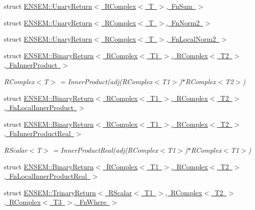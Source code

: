 \begin{DoxyCompactItemize}
\item 
struct \mbox{\hyperlink{structENSEM_1_1UnaryReturn_3_01RComplex_3_01T_01_4_00_01FnSum_01_4}{E\+N\+S\+E\+M\+::\+Unary\+Return$<$ R\+Complex$<$ T $>$, Fn\+Sum $>$}}
\item 
struct \mbox{\hyperlink{structENSEM_1_1UnaryReturn_3_01RComplex_3_01T_01_4_00_01FnNorm2_01_4}{E\+N\+S\+E\+M\+::\+Unary\+Return$<$ R\+Complex$<$ T $>$, Fn\+Norm2 $>$}}
\item 
struct \mbox{\hyperlink{structENSEM_1_1UnaryReturn_3_01RComplex_3_01T_01_4_00_01FnLocalNorm2_01_4}{E\+N\+S\+E\+M\+::\+Unary\+Return$<$ R\+Complex$<$ T $>$, Fn\+Local\+Norm2 $>$}}
\item 
struct \mbox{\hyperlink{structENSEM_1_1BinaryReturn_3_01RComplex_3_01T1_01_4_00_01RComplex_3_01T2_01_4_00_01FnInnerProduct_01_4}{E\+N\+S\+E\+M\+::\+Binary\+Return$<$ R\+Complex$<$ T1 $>$, R\+Complex$<$ T2 $>$, Fn\+Inner\+Product $>$}}
\begin{DoxyCompactList}\small\item\em R\+Complex$<$\+T$>$ = Inner\+Product(adj(\+R\+Complex$<$\+T1$>$)$\ast$\+R\+Complex$<$\+T2$>$) \end{DoxyCompactList}\item 
struct \mbox{\hyperlink{structENSEM_1_1BinaryReturn_3_01RComplex_3_01T1_01_4_00_01RComplex_3_01T2_01_4_00_01FnLocalInnerProduct_01_4}{E\+N\+S\+E\+M\+::\+Binary\+Return$<$ R\+Complex$<$ T1 $>$, R\+Complex$<$ T2 $>$, Fn\+Local\+Inner\+Product $>$}}
\item 
struct \mbox{\hyperlink{structENSEM_1_1BinaryReturn_3_01RComplex_3_01T1_01_4_00_01RComplex_3_01T2_01_4_00_01FnInnerProductReal_01_4}{E\+N\+S\+E\+M\+::\+Binary\+Return$<$ R\+Complex$<$ T1 $>$, R\+Complex$<$ T2 $>$, Fn\+Inner\+Product\+Real $>$}}
\begin{DoxyCompactList}\small\item\em R\+Scalar$<$\+T$>$ = Inner\+Product\+Real(adj(\+R\+Complex$<$\+T1$>$)$\ast$\+R\+Complex$<$\+T1$>$) \end{DoxyCompactList}\item 
struct \mbox{\hyperlink{structENSEM_1_1BinaryReturn_3_01RComplex_3_01T1_01_4_00_01RComplex_3_01T2_01_4_00_01FnLocalInnerProductReal_01_4}{E\+N\+S\+E\+M\+::\+Binary\+Return$<$ R\+Complex$<$ T1 $>$, R\+Complex$<$ T2 $>$, Fn\+Local\+Inner\+Product\+Real $>$}}
\item 
struct \mbox{\hyperlink{structENSEM_1_1TrinaryReturn_3_01RScalar_3_01T1_01_4_00_01RComplex_3_01T2_01_4_00_01RComplex_3_01T3_01_4_00_01FnWhere_01_4}{E\+N\+S\+E\+M\+::\+Trinary\+Return$<$ R\+Scalar$<$ T1 $>$, R\+Complex$<$ T2 $>$, R\+Complex$<$ T3 $>$, Fn\+Where $>$}}

\end{DoxyCompactItemize}
